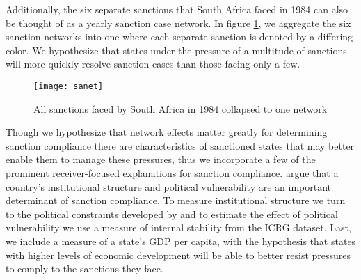 Additionally, the six separate sanctions that South Africa faced in 1984 can also be thought of as a yearly sanction case network. In figure \ref{fig:sanet}, we aggregate the six sanction networks into one where each separate sanction is denoted by a differing color. We hypothesize that states under the pressure of a multitude of sanctions will more quickly resolve sanction cases than those facing only a few.

\begin{figure}[ht]
	\centering
	\texttt{[image: sanet]}
	\caption{All sanctions faced by South Africa in 1984 collapsed to one network}
	\label{fig:sanet}
\end{figure}
\FloatBarrier

Though we hypothesize that network effects matter greatly for determining sanction compliance there are characteristics of sanctioned states that may better enable them to manage these pressures, thus we incorporate a few of the prominent receiver-focused explanations for sanction compliance. \citet{bolks2000} argue that a country's institutional structure and political vulnerability are an important determinant of sanction compliance. To measure institutional structure we turn to the political constraints developed by \citet{henisz2000a} and to estimate the effect of political vulnerability we use a measure of internal stability from the ICRG dataset. Last, we include a measure of a state's GDP per capita, with the hypothesis that states with higher levels of economic development will be able to better resist pressures to comply to the sanctions they face.

